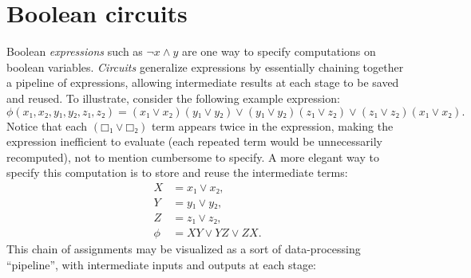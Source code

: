 


\section{Boolean circuits}

Boolean \emph{expressions} such as \(¬x∧y\) are one way to specify computations
on boolean variables.  \emph{Circuits} generalize expressions by essentially
chaining together a pipeline of expressions, allowing intermediate results at
each stage to be saved and reused.  To illustrate, consider the following
example expression:
\[
  ϕ(x₁,x₂,y₁,y₂,z₁,z₂)
  = (x₁∨x₂)(y₁∨y₂) ∨ (y₁∨y₂)(z₁∨z₂) ∨ (z₁∨z₂)(x₁∨x₂).
\]
Notice that each \((□₁∨□₂)\) term appears twice in the expression, making the
expression inefficient to evaluate (each repeated term would be unnecessarily
recomputed), not to mention cumbersome to specify.  A more elegant way to
specify this computation is to store and reuse the intermediate terms:
\begin{align*}
  X &= x₁∨x₂, \\
  Y &= y₁∨y₂, \\
  Z &= z₁∨z₂, \\
  ϕ &= XY∨YZ∨ZX.
\end{align*}
This chain of assignments may be visualized as a sort of data-processing
``pipeline'', with intermediate inputs and outputs at each stage:

